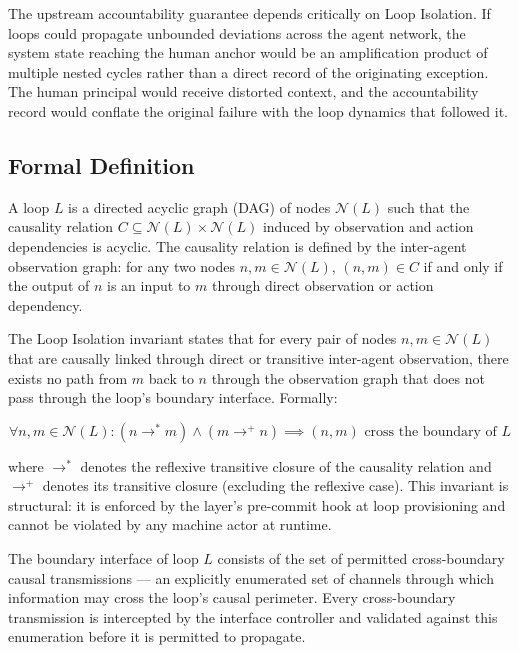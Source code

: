 The upstream accountability guarantee depends critically on Loop Isolation. If loops could propagate unbounded deviations across the agent network, the system state reaching the human anchor would be an amplification product of multiple nested cycles rather than a direct record of the originating exception. The human principal would receive distorted context, and the accountability record would conflate the original failure with the loop dynamics that followed it.

\subsection{Formal Definition}\label{sec:loop-isolation-formal}

A \bxthree{} loop $L$ is a directed acyclic graph (DAG) of nodes $\mathcal{N}(L)$ such that the causality relation $C \subseteq \mathcal{N}(L) \times \mathcal{N}(L)$ induced by observation and action dependencies is acyclic. The causality relation is defined by the inter-agent observation graph: for any two nodes $n, m \in \mathcal{N}(L)$, $(n, m) \in C$ if and only if the output of $n$ is an input to $m$ through direct observation or action dependency.

The Loop Isolation invariant states that for every pair of nodes $n, m \in \mathcal{N}(L)$ that are causally linked through direct or transitive inter-agent observation, there exists no path from $m$ back to $n$ through the observation graph that does not pass through the loop's boundary interface. Formally:

\begin{equation}
\forall n, m \in \mathcal{N}(L) : (n \to^{*} m) \land (m \to^{+} n) \implies (n, m) \text{ cross the boundary of } L
\end{equation}

where $\to^{*}$ denotes the reflexive transitive closure of the causality relation and $\to^{+}$ denotes its transitive closure (excluding the reflexive case). This invariant is structural: it is enforced by the \fact{} layer's pre-commit hook at loop provisioning and cannot be violated by any machine actor at runtime.

The boundary interface of loop $L$ consists of the set of permitted cross-boundary causal transmissions — an explicitly enumerated set of channels through which information may cross the loop's causal perimeter. Every cross-boundary transmission is intercepted by the interface controller and validated against this enumeration before it is permitted to propagate.

